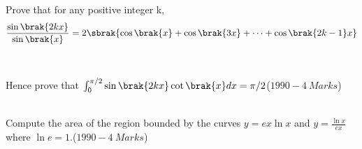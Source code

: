 			 \item Prove that for any positive integer k,
				 \begin{align*} \frac{\sin{\brak{2kx}}}{\sin{\brak{x}}}=2\sbrak{\cos{\brak{x}}+\cos{\brak{3x}}+\cdots+\cos{\brak{2k-1}x}}
				 \end{align*}
					 \\\\Hence prove that $\int_{0}^{\pi/2}\sin{\brak{2kx}}\cot{\brak{x}}dx=\pi/2$\hfill($1990-4\ Marks$)\\\\
				 \item Compute the area of the region bounded by the curves $y=ex\ln{x}$ and $y=\frac{\ln{x}}{ex}$ where $\ln{e}=1$.\hfill($1990-4\ Marks$)\\\\
